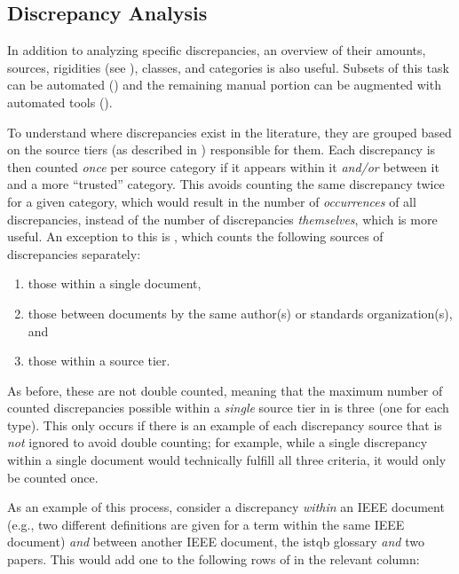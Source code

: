 \subsection{Discrepancy Analysis}
\label{discrep-analysis}

In addition to analyzing specific discrepancies, an overview of their amounts,
sources, rigidities (see ), classes, and categories is
also useful. Subsets of this task can be automated ()
and the remaining manual portion can be augmented with automated
tools ().

To understand where discrepancies exist in the literature, they are
grouped based on the source tiers (as described in )
responsible for them. Each discrepancy is then counted \emph{once} per source
category if it appears within it \emph{and/or} between it and a more
``trusted'' category. This avoids counting the same discrepancy twice for a
given category, which would result in the number of
\emph{occurrences} of all discrepancies, instead of the number of discrepancies
\emph{themselves}, which is more useful. An exception to this is
, which counts the following sources of discrepancies
separately:
\begin{enumerate}
    \item those within a single document,
    \item those between documents by the same author(s) or standards
          organization(s), and
    \item those within a source tier.
\end{enumerate}
As before, these are not double counted, meaning that the maximum number of
counted discrepancies possible within a \emph{single} source tier in
 is three (one for each type). This only occurs if
there is an example of each discrepancy source that is \emph{not} ignored to
avoid double counting; for example, while a single discrepancy within a single
document would technically fulfill all three criteria, it would only be counted
once.

\label{discrep-analysis-example}
As an example of this process, consider a discrepancy \emph{within} an IEEE
document (e.g., two different definitions are given for a term within the same
IEEE document) \emph{and} between another IEEE document, the \acs{istqb}
glossary \emph{and} two papers. This would add one to the following rows of
 in the relevant column:

